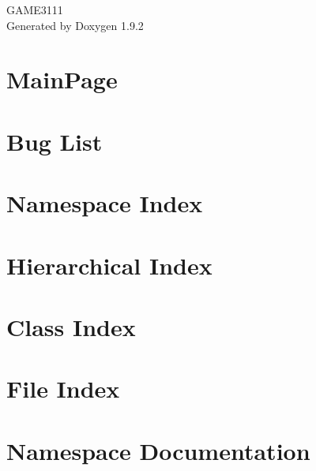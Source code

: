 \documentclass[twoside]{book}
\newcommand{\+}{\discretionary{\mbox{\scriptsize$\hookleftarrow$}}{}{}}
\newcommand{\clearemptydoublepage}{%
    \newpage{\pagestyle{empty}\cleardoublepage}%
  }
\begin{document}
  \raggedbottom
    \hypersetup{pageanchor=false,
                bookmarksnumbered=true,
                pdfencoding=unicode
               }
  \begin{titlepage}
  \vspace*{7cm}
  \begin{center}%
  {\Large GAME3111}\\
  \vspace*{1cm}
  {\large Generated by Doxygen 1.9.2}\\
  \end{center}
  \end{titlepage}
  \clearemptydoublepage
  \tableofcontents
  \clearemptydoublepage
  \hypersetup{pageanchor=true}
\chapter{Main\+Page}
\label{index}\hypertarget{index}{}
\chapter{Bug List}
\label{bug}

\chapter{Namespace Index}

\chapter{Hierarchical Index}

\chapter{Class Index}

\chapter{File Index}

\chapter{Namespace Documentation}


\end{document}
